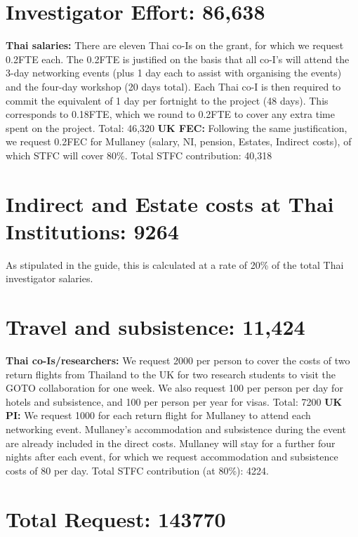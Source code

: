 \documentclass[11pt]{article}
\begin{document}
  \section{Investigator Effort: 86,638}
  \vspace{-3mm}
  {\bf Thai salaries:} There are eleven Thai co-Is on the grant, for which we request 0.2FTE each. The 0.2FTE is justified on the basis that all co-I's will attend the 3-day networking events (plus 1 day each to assist with organising the events) and the four-day workshop (20 days total). Each Thai co-I is then required to commit the equivalent of 1 day per fortnight to the project (48 days). This corresponds to 0.18FTE, which we round to 0.2FTE to cover any extra time spent on the project. Total: 46,320 {\bf UK FEC:} Following the same justification, we request 0.2FEC for Mullaney (salary, NI, pension, Estates, Indirect costs), of which STFC will cover 80\%. Total STFC contribution: 40,318
  
  \vspace{-3mm}
  \section{Indirect and Estate costs at Thai Institutions: 9264}
  \vspace{-3mm}
  As stipulated in the guide, this is calculated at a rate of 20\% of the total Thai investigator salaries.
  
  \vspace{-3mm}
  \section{Travel and subsistence: 11,424}
  \vspace{-3mm}
  {\bf Thai co-Is/researchers:} We request 2000 per person to cover the costs of two return flights from Thailand to the UK for two research students to visit the GOTO collaboration for one week. We also request 100 per person per day for hotels and subsistence, and 100 per person per year for visas. Total: 7200 {\bf UK PI:} We request 1000 for each return flight for Mullaney to attend each networking event. Mullaney's accommodation and subsistence during the event are already included in the direct costs. Mullaney will stay for a further four nights after each event, for which we request accommodation and subsistence costs of 80 per day. Total STFC contribution (at 80\%): 4224.
  
  \vspace{-3mm}
  \section{Total Request: 143770}
  
  
\end{document}
